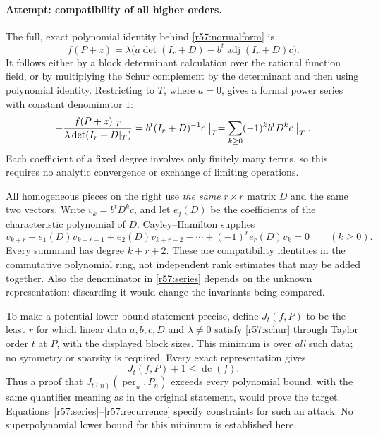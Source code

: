 \documentclass[11pt,a4paper]{article}
\numberwithin{equation}{section}
\begin{document}
\paragraph{Attempt: compatibility of all higher orders.}
The full, exact polynomial identity behind \eqref{r57:normalform} is
\begin{equation}\label{r57:schur}
 f(P+z)=\lambda\bigl(a\det(I_r+D)-b^t\operatorname{adj}(I_r+D)c\bigr).
\end{equation}
It follows either by a block determinant calculation over the rational function field, or by multiplying the Schur complement by the determinant and then using polynomial identity. Restricting to $T$, where $a=0$, gives a formal power series with constant denominator $1$:
\begin{equation}\label{r57:series}
 -\frac{f(P+z)|_T}{\lambda\det(I_r+D|_T)}
   =b^t(I_r+D)^{-1}c\bigm|_T
   =\sum_{k\geq0}(-1)^k b^tD^kc\bigm|_T.
\end{equation}
Each coefficient of a fixed degree involves only finitely many terms, so this requires no analytic convergence or exchange of limiting operations.

All homogeneous pieces on the right use \emph{the same} $r\times r$ matrix $D$ and the same two vectors. Write $v_k=b^tD^kc$, and let $e_j(D)$ be the coefficients of the characteristic polynomial of $D$. Cayley--Hamilton supplies
\begin{equation}\label{r57:recurrence}
 v_{k+r}-e_1(D)v_{k+r-1}+e_2(D)v_{k+r-2}
          -\cdots+(-1)^re_r(D)v_k=0\qquad(k\geq0).
\end{equation}
Every summand has degree $k+r+2$. These are compatibility identities in the commutative polynomial ring, not independent rank estimates that may be added together. Also the denominator in \eqref{r57:series} depends on the unknown representation: discarding it would change the invariants being compared.

To make a potential lower-bound statement precise, define $J_t(f,P)$ to be the least $r$ for which linear data $a,b,c,D$ and $\lambda\ne0$ satisfy \eqref{r57:schur} through Taylor order $t$ at $P$, with the displayed block sizes. This minimum is over \emph{all} such data; no symmetry or sparsity is required. Every exact representation gives
\begin{equation}\label{r57:jetbound}
 J_t(f,P)+1\leq\operatorname{dc}(f).
\end{equation}
Thus a proof that $J_{t(n)}(\operatorname{per}_n,P_n)$ exceeds every polynomial bound, with the same quantifier meaning as in the original statement, would prove the target. Equations~\eqref{r57:series}--\eqref{r57:recurrence} specify constraints for such an attack. No superpolynomial lower bound for this minimum is established here.
\end{document}
